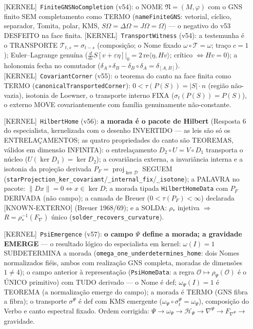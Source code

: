 \documentclass[11pt]{article}
\providecommand{\kernelmk}[1]{\textsf{[KERNEL]}~\texttt{#1}}\providecommand{\knownmk}[1]{\textsf{[KNOWN]}~{#1}}\providecommand{\statusmk}[1]{\textsf{[#1]}}
\theoremstyle{definition}\newtheorem{deriv}{Derivação}
\begin{document}
\kernelmk{FiniteGNSNoCompletion} (v54): o NOME $\mathfrak N=(M,\varphi)$ com o GNS finito SEM completamento como TERMO (\texttt{nameFiniteGNS}: vetorial, cíclico, separador, Tomita, polar, KMS, $S\Omega=\Delta\Omega=J\Omega=\Omega$) --- o negativo do v53 DESFEITO na face finita. \kernelmk{TransportWitness} (v54): a testemunha é o TRANSPORTE $\mathcal{T}_{t,s}=\sigma_{t-s}$ (composição; o Nome fixado $\omega\circ\mathcal{T}=\omega$; traço $c=1$); Euler--Lagrange genuína ($\tfrac{d}{d\varepsilon}S[v+\varepsilon\eta]|_0=2\,\mathrm{re}\langle\eta,Hv\rangle$; crítico $\iff Hv=0$); a holonomia fecha no comutador ($\delta_A\circ\delta_B-\delta_B\circ\delta_A=\delta_{[A,B]}$). \kernelmk{CovariantCorner} (v55): o teorema do canto na face finita como TERMO (\texttt{canonicalTransportedCorner}): $0<\tau(P(S))=|S|\cdot n$ (região não-vazia), isotonia de Loewner, o transporte interno FIXA ($\sigma_t(P(S))=P(S)$), o externo MOVE covariantemente com família genuinamente não-constante.

\kernelmk{HilbertHome} (v56): \textbf{a morada é o pacote de Hilbert} (Resposta 6 do especialista, kernelizada com o desenho INVERTIDO --- as leis são só os ENTRELAÇAMENTOS; as quatro propriedades do canto são TEOREMAS, válidos em dimensão INFINITA): o entrelaçamento $D_2\circ U=V\circ D_1$ transporta o núcleo ($U(\ker D_1)=\ker D_2$); a covariância externa, a invariância interna e a isotonia da projeção derivada $P_F=\operatorname{proj}_{\ker\mathcal D}$ SEGUEM (\texttt{starProjection\_ker\_covariant}/\texttt{\_internal\_fix}/\texttt{\_isotone}); a PALAVRA no pacote: $\|Dx\|=0\iff x\in\ker D$; a morada tipada \texttt{HilbertHomeData} com $P_F$ DERIVADA (não campo); a camada de Breuer ($0<\tau(P_F)<\infty$) declarada \statusmk{KNOWN-EXTERNO} (Breuer 1968/69); e a SOLDA: $\rho_*$ injetiva $\Rightarrow$ $R=\rho_*^{-1}(F_\nabla)$ único (\texttt{solder\_recovers\_curvature}).

\kernelmk{PsiEmergence} (v57): \textbf{o campo $\Psi$ define a morada; a gravidade EMERGE} --- o resultado lógico do especialista em kernel: $\omega(I)=1$ SUBDETERMINA a morada (\texttt{omega\_one\_underdetermines\_home}: dois Nomes normalizados fiéis, ambos com realização GNS completa, moradas de dimensões $1\neq4$); o campo anterior à representação (\texttt{PsiHomeData}: a regra $\mathcal O\mapsto\rho_\Psi(\mathcal O)$ é o ÚNICO primitivo) com TUDO derivado --- o Nome é def; $\omega_\Psi(I)=1$ é TEOREMA (a normalização emerge do campo); a morada é TERMO (GNS fibra a fibra); o transporte $\sigma^\Psi$ é def com KMS emergente ($\omega_\Psi\circ\sigma^\Psi_t=\omega_\Psi$), composição do Verbo e canto espectral fixado. Ordem corrigida: $\Psi\to\omega_\Psi\to\mathcal H_\Psi\to\nabla^\Psi\to F_{\nabla^\Psi}\to$ gravidade.
\end{document}
